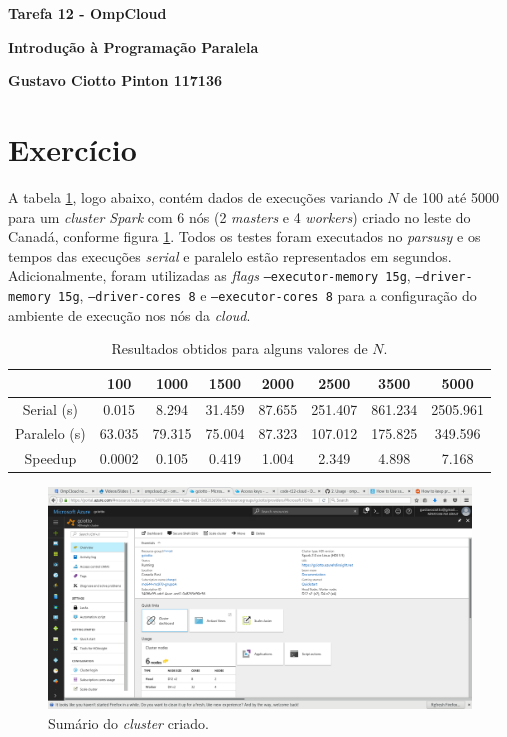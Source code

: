 \documentclass[12pt, a4paper]{article}
\begin{document}
{\large
\centerline{\textbf{Tarefa 12 - OmpCloud}}
\centerline{\textbf{Introdução à Programação Paralela}}
\centerline{\textbf{Gustavo Ciotto Pinton 117136}}
}

\section{Exercício}

A tabela \ref{tab:resultados}, logo abaixo, contém dados de execuções variando
\(N\) de 100 até 5000 para um \textit{cluster Spark} com 6 nós (2
\textit{masters} e 4 \textit{workers}) criado no leste do Canadá, conforme
figura \ref{fig:dashboard}. Todos os testes foram executados no
\textit{parsusy} e os tempos das execuções \textit{serial} e paralelo estão
representados em segundos. Adicionalmente, foram utilizadas as \textit{flags} \texttt{--executor-memory 15g}, \texttt{--driver-memory 15g},
\texttt{--driver-cores 8} e \texttt{--executor-cores 8} para a configuração
do ambiente de execução nos nós da \textit{cloud}.

\begin{table}[h]
    \centering
	\caption{\label{tab:resultados} Resultados obtidos para alguns valores de \(N\).} 
	\begin{tabular}{| c | c | c | c | c | c | c | c |}
		\hline
		 & \textbf{100} & \textbf{1000} & \textbf{1500} & \textbf{2000} &  \textbf{2500} & \textbf{3500} & \textbf{5000}\\\hline 
		 Serial (s) & 0.015  & 8.294 & 31.459 & 87.655 & 251.407 & 861.234 & 2505.961 \\\hline 
		 Paralelo (s) & 63.035 & 79.315 & 75.004 & 87.323 & 107.012 & 175.825 & 349.596 \\\hline 
		 Speedup & 0.0002 & 0.105  & 0.419  & 1.004 & 2.349 & 4.898 & 7.168 \\\hline
		
	\end{tabular}
\end{table}

\begin{figure}[h!] 
    \centering
    \includegraphics[width=\textwidth]{img/dashboard}
    \caption{Sumário do \textit{cluster} criado.}        
    \label{fig:dashboard}
\end{figure}
\end{document}
